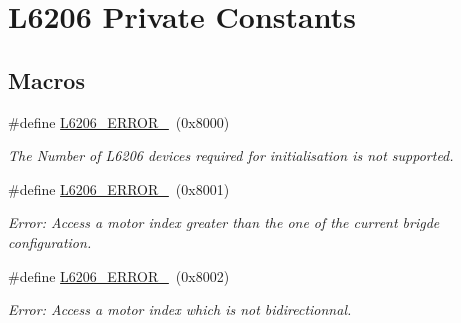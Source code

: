 \hypertarget{group___l6206___private___constants}{}\section{L6206 Private Constants}
\label{group___l6206___private___constants}
\subsection*{Macros}
\begin{DoxyCompactItemize}
\item 
\mbox{\label{group___l6206___private___constants_ga948d4a8747cc71ce4be0b5bd5eaae446}} 
\#define \mbox{\hyperlink{group___l6206___private___constants_ga948d4a8747cc71ce4be0b5bd5eaae446}{L6206\+\_\+\+E\+R\+R\+O\+R\+\_}}~(0x8000)
\begin{DoxyCompactList}\small\item\em The Number of L6206 devices required for initialisation is not supported. \end{DoxyCompactList}\item 
\mbox{\label{group___l6206___private___constants_ga6252891e4f735b772318b06fcf42c6a5}} 
\#define \mbox{\hyperlink{group___l6206___private___constants_ga6252891e4f735b772318b06fcf42c6a5}{L6206\+\_\+\+E\+R\+R\+O\+R\+\_}}~(0x8001)
\begin{DoxyCompactList}\small\item\em Error\+: Access a motor index greater than the one of the current brigde configuration. \end{DoxyCompactList}\item 
\mbox{\label{group___l6206___private___constants_ga9e77e4acc34c35a89308431c9af2af48}} 
\#define \mbox{\hyperlink{group___l6206___private___constants_ga9e77e4acc34c35a89308431c9af2af48}{L6206\+\_\+\+E\+R\+R\+O\+R\+\_}}~(0x8002)
\begin{DoxyCompactList}\small\item\em Error\+: Access a motor index which is not bidirectionnal. \end{DoxyCompactList}\item 
\mbox{\label{group___l6206___private___constants_ga978d83ef1e5b8d4652aaa54d2ca0b61d}} 

\end{DoxyCompactItemize}
